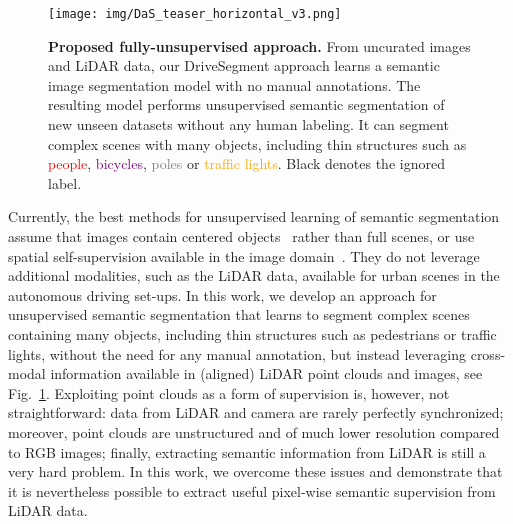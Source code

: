 \documentclass[runningheads]{llncs}
\newcommand{\ours}{DriveSegment\xspace}
\begin{document}
\begin{figure}[t]
    \centering
    \texttt{[image: img/DaS\_teaser\_horizontal\_v3.png]}
    \vspace{-20pt}
    \caption{
    {\bf Proposed fully-unsupervised approach.} From uncurated images and LiDAR data, our \ours approach learns a semantic image segmentation model with no manual annotations. The resulting model performs unsupervised semantic segmentation of new unseen datasets 
    without any human labeling. It can segment complex scenes with many objects, including thin structures such as \textcolor{red}{people}, \textcolor{purple}{bicycles}, \textcolor{gray}{poles} or \textcolor{orange}{traffic lights}. Black denotes the ignored label.
    }
    \label{fig:teaser}
    \vspace{-15pt}
\end{figure}

Currently, the best methods for unsupervised learning of semantic segmentation assume that images contain centered objects~\cite{van2021unsupervised} rather than full scenes, or use spatial self-supervision available in the image domain~\cite{cho2021picie}. They do not leverage additional modalities, such as the LiDAR data, available for urban scenes in the autonomous driving set-ups. In this work, we develop an approach for unsupervised semantic segmentation that learns to segment complex scenes containing many objects, including thin structures such as pedestrians or traffic lights, without the need for any manual annotation, but instead leveraging cross-modal information available in (aligned) LiDAR point clouds and images, see Fig.~\ref{fig:teaser}. 
Exploiting point clouds as a form of supervision is, however, not straightforward: data from LiDAR and camera are rarely perfectly synchronized; moreover, point clouds are unstructured and of much lower resolution compared to RGB images; finally, extracting semantic information from LiDAR is still a very hard problem. In this work, we overcome these issues and demonstrate that it is nevertheless possible to extract useful pixel-wise semantic supervision from LiDAR data.
\end{document}
